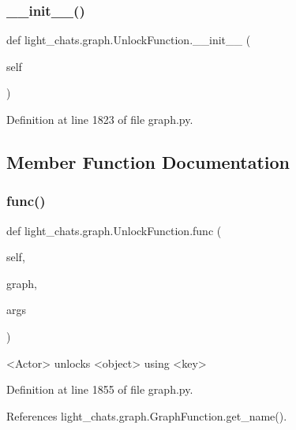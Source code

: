 \subsubsection{\texorpdfstring{\+\_\+\+\_\+init\+\_\+\+\_\+()}{\_\_init\_\_()}}
{\footnotesize\ttfamily def light\+\_\+chats.\+graph.\+Unlock\+Function.\+\_\+\+\_\+init\+\_\+\+\_\+ (\begin{DoxyParamCaption}\item[{}]{self }\end{DoxyParamCaption})}



Definition at line 1823 of file graph.\+py.



\subsection{Member Function Documentation}
\mbox{\label{classlight__chats_1_1graph_1_1UnlockFunction_a60b9bd71f3b3d8255c9f79a3a408914f}} 
\subsubsection{\texorpdfstring{func()}{func()}}
{\footnotesize\ttfamily def light\+\_\+chats.\+graph.\+Unlock\+Function.\+func (\begin{DoxyParamCaption}\item[{}]{self,  }\item[{}]{graph,  }\item[{}]{args }\end{DoxyParamCaption})}

\begin{DoxyVerb}<Actor> unlocks <object> using <key>\end{DoxyVerb}
 

Definition at line 1855 of file graph.\+py.



References light\+\_\+chats.\+graph.\+Graph\+Function.\+get\+\_\+name().

